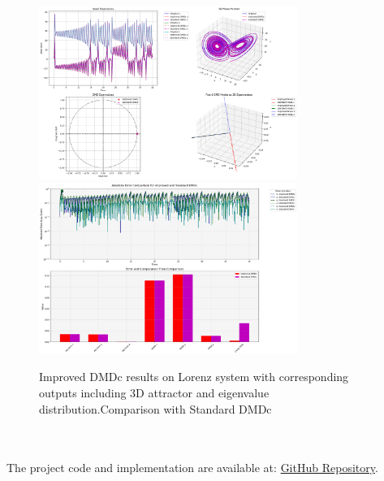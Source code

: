 \documentclass[a4paper,12pt]{report}
\theoremstyle{definition}
\numberwithin{equation}{section}
\begin{document}
\begin{figure}[h!]
    \centering
    
    \vspace{1em}
    
    \includegraphics[width=0.75\textwidth]{IMPROVED LORENZ.png}
    \vspace{1em}    
    \includegraphics[width=0.75\textwidth]{IPROVED_Lorenz_error_time.png}
    \caption{Improved DMDc results on Lorenz system with corresponding outputs including 3D attractor and eigenvalue distribution.Comparison with Standard DMDc}
\end{figure}
\\\\

The project code and implementation are available at: 
\href{https://github.com/thexuanphuc/impoved_DMDC/tree/master}{GitHub Repository}.

\newpage
\renewcommand{\bibname}{References}
\begingroup
\small


\endgroup
\end{document}
